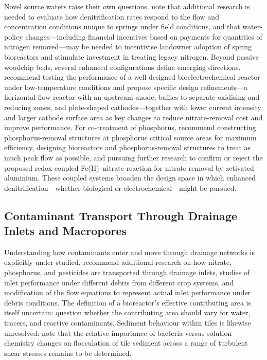 Novel source waters raise their own questions. \textcite{Easton2019} note that additional research is needed to evaluate how denitrification rates respond to the flow and concentration conditions unique to springs under field conditions, and that water-policy changes---including financial incentives based on payments for quantities of nitrogen removed---may be needed to incentivise landowner adoption of spring bioreactors and stimulate investment in treating legacy nitrogen. Beyond passive woodchip beds, several enhanced configurations define emerging directions. \textcite{Law2018} recommend testing the performance of a well-designed bioelectrochemical reactor under low-temperature conditions and propose specific design refinements---a horizontal-flow reactor with an upstream anode, baffles to separate oxidising and reducing zones, and plate-shaped cathodes---together with lower current intensity and larger cathode surface area as key changes to reduce nitrate-removal cost and improve performance. For co-treatment of phosphorus, \textcite{Penn2024} recommend constructing phosphorus-removal structures at phosphorus critical source areas for maximum efficiency, designing bioreactors and phosphorus-removal structures to treat as much peak flow as possible, and pursuing further research to confirm or reject the proposed redox-coupled Fe(II)--nitrate reaction for nitrate removal by activated aluminium. These coupled systems broaden the design space in which enhanced denitrification---whether biological or electrochemical---might be pursued.

\subsection{Contaminant Transport Through Drainage Inlets and Macropores}
Understanding how contaminants enter and move through drainage networks is explicitly under-studied. \textcite{Li2017b} recommend additional research on how nitrate, phosphorus, and pesticides are transported through drainage inlets, studies of inlet performance under different debris from different crop systems, and modification of the flow equations to represent actual inlet performance under debris conditions. The definition of a bioreactor's effective contributing area is itself uncertain: \textcite{Akay2008} question whether the contributing area should vary for water, tracers, and reactive contaminants. Sediment behaviour within tiles is likewise unresolved: \textcite{Stone1997} note that the relative importance of bacteria versus solution-chemistry changes on flocculation of tile sediment across a range of turbulent shear stresses remains to be determined.

